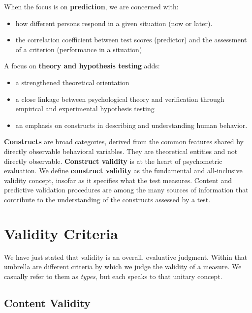 \documentclass[
  english,
]{book}
\providecommand{\tightlist}{%
  \setlength{\itemsep}{0pt}\setlength{\parskip}{0pt}}
\begin{document}
When the focus is on \textbf{prediction}, we are concerned with:

\begin{itemize}
\tightlist
\item
  how different persons respond in a given situation (now or later).
\item
  the correlation coefficient between test scores (predictor) and the assessment of a criterion (performance in a situation)
\end{itemize}

A focus on \textbf{theory and hypothesis testing} adds:

\begin{itemize}
\tightlist
\item
  a strengthened theoretical orientation
\item
  a close linkage between psychological theory and verification through empirical and experimental hypothesis testing
\item
  an emphasis on constructs in describing and understanding human behavior.
\end{itemize}

\textbf{Constructs} are broad categories, derived from the common features shared by directly observable behavioral variables. They are theoretical entities and not directly observable. \textbf{Construct validity} is at the heart of psychometric evaluation. We define \textbf{construct validity} as the fundamental and all-inclusive validity concept, insofar as it specifies what the test measures. Content and predictive validation procedures are among the many sources of information that contribute to the understanding of the constructs assessed by a test.

\hypertarget{validity-criteria}{%
\section{Validity Criteria}\label{validity-criteria}}

We have just stated that validity is an overall, evaluative judgment. Within that umbrella are different criteria by which we judge the validity of a measure. We casually refer to them as \emph{types}, but each speaks to that unitary concept.

\hypertarget{content-validity}{%
\subsection{Content Validity}\label{content-validity}}
\end{document}
